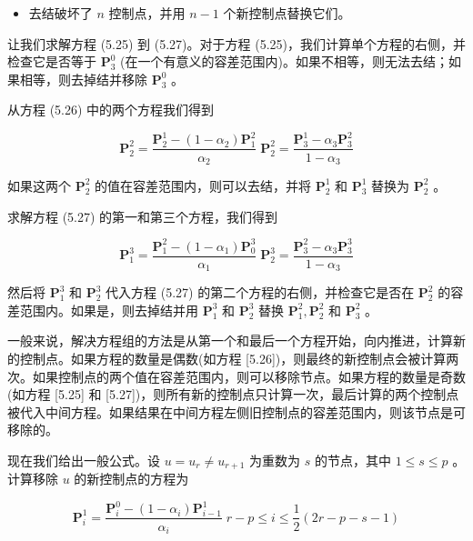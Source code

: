 \documentclass[../main.tex]{subfiles}
\begin{document}
\begin{itemize}
\item 去结破坏了 \(n\) 控制点，并用 \(n - 1\) 个新控制点替换它们。
\end{itemize}

让我们求解方程 (5.25) 到 (5.27)。对于方程 (5.25)，我们计算单个方程的右侧，并检查它是否等于 \({\mathbf{P}}_{3}^{0}\) (在一个有意义的容差范围内)。如果不相等，则无法去结；如果相等，则去掉结并移除 \({\mathbf{P}}_{3}^{0}\) 。

从方程 (5.26) 中的两个方程我们得到

\[
{\mathbf{P}}_{2}^{2} = \frac{{\mathbf{P}}_{2}^{1} - \left( {1 - {\alpha }_{2}}\right) {\mathbf{P}}_{1}^{2}}{{\alpha }_{2}}\;{\mathbf{P}}_{2}^{2} = \frac{{\mathbf{P}}_{3}^{1} - {\alpha }_{3}{\mathbf{P}}_{3}^{2}}{1 - {\alpha }_{3}}
\]

如果这两个 \({\mathbf{P}}_{2}^{2}\) 的值在容差范围内，则可以去结，并将 \({\mathbf{P}}_{2}^{1}\) 和 \({\mathbf{P}}_{3}^{1}\) 替换为 \({\mathbf{P}}_{2}^{2}\) 。

求解方程 (5.27) 的第一和第三个方程，我们得到

\[
{\mathbf{P}}_{1}^{3} = \frac{{\mathbf{P}}_{1}^{2} - \left( {1 - {\alpha }_{1}}\right) {\mathbf{P}}_{0}^{3}}{{\alpha }_{1}}\;{\mathbf{P}}_{2}^{3} = \frac{{\mathbf{P}}_{3}^{2} - {\alpha }_{3}{\mathbf{P}}_{3}^{3}}{1 - {\alpha }_{3}}
\]

然后将 \({\mathbf{P}}_{1}^{3}\) 和 \({\mathbf{P}}_{2}^{3}\) 代入方程 (5.27) 的第二个方程的右侧，并检查它是否在 \({\mathbf{P}}_{2}^{2}\) 的容差范围内。如果是，则去掉结并用 \({\mathbf{P}}_{1}^{3}\) 和 \({\mathbf{P}}_{2}^{3}\) 替换 \({\mathbf{P}}_{1}^{2},{\mathbf{P}}_{2}^{2}\) 和 \({\mathbf{P}}_{3}^{2}\) 。

一般来说，解决方程组的方法是从第一个和最后一个方程开始，向内推进，计算新的控制点。如果方程的数量是偶数(如方程 [5.26])，则最终的新控制点会被计算两次。如果控制点的两个值在容差范围内，则可以移除节点。如果方程的数量是奇数(如方程 [5.25] 和 [5.27])，则所有新的控制点只计算一次，最后计算的两个控制点被代入中间方程。如果结果在中间方程左侧旧控制点的容差范围内，则该节点是可移除的。

现在我们给出一般公式。设 \(u = {u}_{r} \neq  {u}_{r + 1}\) 为重数为 \(s\) 的节点，其中 \(1 \leq  s \leq  p\) 。计算移除 \(u\) 的新控制点的方程为

\[
{\mathbf{P}}_{i}^{1} = \frac{{\mathbf{P}}_{i}^{0} - \left( {1 - {\alpha }_{i}}\right) {\mathbf{P}}_{i - 1}^{1}}{{\alpha }_{i}}\;r - p \leq  i \leq  \frac{1}{2}\left( {{2r} - p - s - 1}\right)
\]
\end{document}
